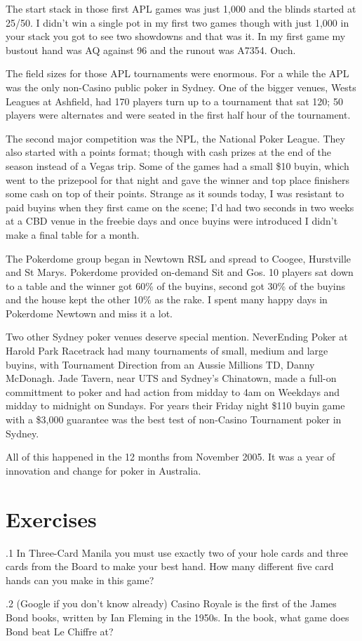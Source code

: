 The start stack in those first APL games was just 1,000 and the blinds
started at 25/50. I didn't win a single pot in my first two
games though with just 1,000 in your stack you got to see two
showdowns and that was it. In my first game my bustout hand was
AQ against 96 and the runout was A7354. Ouch.

The field sizes for those APL tournaments were enormous. For a while
the APL was the only non-Casino public poker in Sydney. One of the bigger
venues, Wests Leagues at Ashfield, had 170 players turn up to a
tournament that sat 120; 50 players were alternates and were seated in
the first half hour of the tournament.

The second major competition was the NPL, the National Poker
League. They also started with a points format; though with
cash prizes at the end of the season instead of a Vegas trip. Some of
the games had a small \$10 buyin, which went to the prizepool for that
night and gave the winner and top place finishers some cash on top of
their points. Strange as it sounds today, I was resistant to
paid buyins when they first came on the scene; I'd had two seconds in
two weeks at a CBD venue in the freebie days and once buyins were
introduced I didn't make a final table for a month.


The Pokerdome group began in Newtown RSL and spread to Coogee,
Hurstville and St Marys. Pokerdome provided on-demand Sit and Gos.
10 players sat down to a table and the winner got 60\% of the buyins,
second got 30\% of the buyins and the house kept the other 10\% as the
rake. I spent many happy days in Pokerdome Newtown and miss it a lot.

Two other Sydney poker venues deserve special mention. NeverEnding
Poker at Harold Park Racetrack had many tournaments of small, medium
and large buyins, with Tournament Direction from an Aussie Millions
TD, Danny McDonagh. Jade Tavern, near UTS and Sydney's Chinatown, made
a full-on committment to poker and had action from midday to 4am on
Weekdays and midday to midnight on Sundays. For years their Friday
night \$110 buyin game with a \$3,000 guarantee was the best test of
non-Casino Tournament poker in Sydney.

All of this happened in the 12 months from November 2005. It was a
year of innovation and change for poker in Australia.


\section{Exercises}

.1 In Three-Card Manila you must use exactly two of
your hole cards and three cards from the Board to make your best
hand. How many different five card hands can you make in this game?

.2 (Google if you don't know already) Casino Royale
is the first of the James Bond books, written by Ian Fleming in the
1950s. In the book, what game does Bond beat Le Chiffre at?
